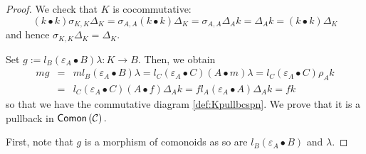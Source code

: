 \documentclass[nosumlimits,twoside]{amsart}
\theoremstyle{definition}
\theoremstyle{remark}
\def\Comon{{\sf Comon}}
\begin{document}
\begin{proof}
We check that $K$ is cocommutative:
\begin{equation*}
\left( k\bullet k\right) \sigma _{K,K}\Delta _{K}=\sigma
_{A,A}\left( k\bullet k\right) \Delta _{K}=\sigma _{A,A}\Delta
_{A}k=\Delta _{A}k=\left( k\bullet k\right) \Delta
_{K}
\end{equation*}%
and hence $\sigma _{K,K}\Delta _{K}=\Delta _{K}.$


Set $g:=l_{B}\left( \varepsilon _{A}\bullet
B\right) \lambda :K\to B$. Then, we obtain%
\begin{eqnarray*}
mg &=&ml_{B}\left( \varepsilon _{A}\bullet
B\right) \lambda =l_{C}\left( \varepsilon _{A}\bullet
C\right) \left( A\bullet m\right) \lambda =l_{C}\left(
\varepsilon _{A}\bullet C\right) \rho _{A}k \\
&=&l_{C}\left( \varepsilon _{A}\bullet C\right) \left(
A\bullet f\right) \Delta _{A}k=fl_{A}\left(
\varepsilon _{A}\bullet A\right) \Delta _{A}k=fk
\end{eqnarray*}
so that we have the commutative diagram \eqref{def:Kpullbcspn}.
We prove that it is a pullback in $\Comon \left( \mathcal{C}\right) .$

First, note that $g$ is a morphism of comonoids as so are $l_B(\varepsilon_A\bullet B)$ and $\lambda$.


\end{proof}
\end{document}
